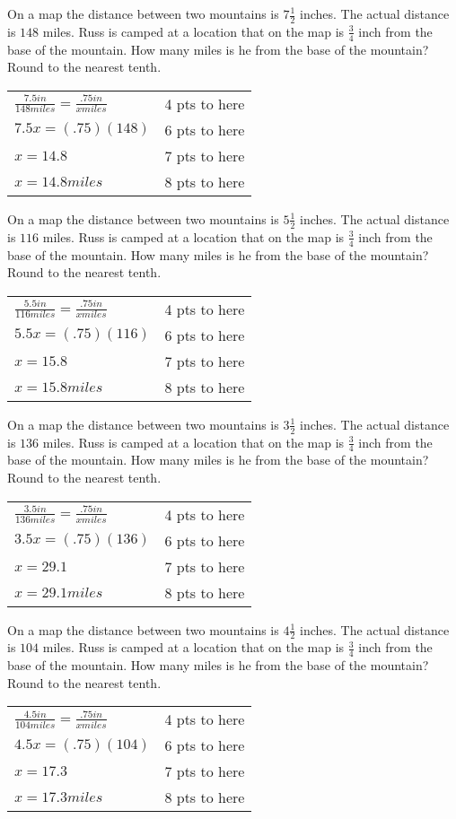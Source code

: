{
	On a map the distance between two mountains is $7\frac{1}{2}$ inches. The actual distance is $148$ miles. Russ is camped at a location that on the map is $\frac{3}{4}$ inch from the base of the mountain. How many miles is he from the base of the mountain? Round to the nearest tenth.
}
{
	\begin{tabular}{l r}
	$\frac{7.5 in}{148 miles}=\frac{.75in}{x miles}$ & 4 pts to here\\
	$7.5x=(.75)(148)$ & 6 pts to here\\
	$x=14.8$ & 7 pts to here\\
	$x=14.8 miles$ & 8 pts to here\\
	\end{tabular}
}

{
	On a map the distance between two mountains is $5\frac{1}{2}$ inches. The actual distance is $116$ miles. Russ is camped at a location that on the map is $\frac{3}{4}$ inch from the base of the mountain. How many miles is he from the base of the mountain? Round to the nearest tenth.
}
{
	\begin{tabular}{l r}
	$\frac{5.5 in}{116 miles}=\frac{.75in}{x miles}$ & 4 pts to here\\
	$5.5x=(.75)(116)$ & 6 pts to here\\
	$x=15.8$ & 7 pts to here\\
	$x=15.8 miles$ & 8 pts to here\\
	\end{tabular}
}

{
	On a map the distance between two mountains is $3\frac{1}{2}$ inches. The actual distance is $136$ miles. Russ is camped at a location that on the map is $\frac{3}{4}$ inch from the base of the mountain. How many miles is he from the base of the mountain? Round to the nearest tenth.
}
{
	\begin{tabular}{l r}
	$\frac{3.5 in}{136 miles}=\frac{.75in}{x miles}$ & 4 pts to here\\
	$3.5x=(.75)(136)$ & 6 pts to here\\
	$x=29.1$ & 7 pts to here\\
	$x=29.1 miles$ & 8 pts to here\\
	\end{tabular}
}

{
	On a map the distance between two mountains is $4\frac{1}{2}$ inches. The actual distance is $104$ miles. Russ is camped at a location that on the map is $\frac{3}{4}$ inch from the base of the mountain. How many miles is he from the base of the mountain? Round to the nearest tenth.
}
{
	\begin{tabular}{l r}
	$\frac{4.5 in}{104 miles}=\frac{.75in}{x miles}$ & 4 pts to here\\
	$4.5x=(.75)(104)$ & 6 pts to here\\
	$x=17.3$ & 7 pts to here\\
	$x=17.3 miles$ & 8 pts to here\\
	\end{tabular}
}
